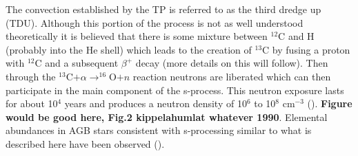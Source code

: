 The convection established by the TP is referred to as the third
dredge up (TDU).  Although this portion of the process is not as well
understood theoretically it is believed that there is some mixture
between $^{12}$C
and H (probably into the He shell) which leads to the creation of
$^{13}$C by fusing a proton 
with $^{12}$C and a subsequent $\beta^+$ decay (more details on this
will follow).  Then through the
$^{13}$C$+ \alpha \rightarrow ^{16}$O$+n$ reaction neutrons are
liberated which can then participate in the main component of the
s-process.  This neutron exposure lasts for about 10$^4$ years and
produces a neutron density of 10$^6$ to 10$^8$ cm$^{-3}$
(\citealt{kappeleretal2011}).  {\bf Figure would be good here, Fig.2
kippelahumlat whatever 1990}.  Elemental abundances in AGB stars consistent with
s-processing similar to what is described here have been observed (\citealt{smithlambert1990}).

